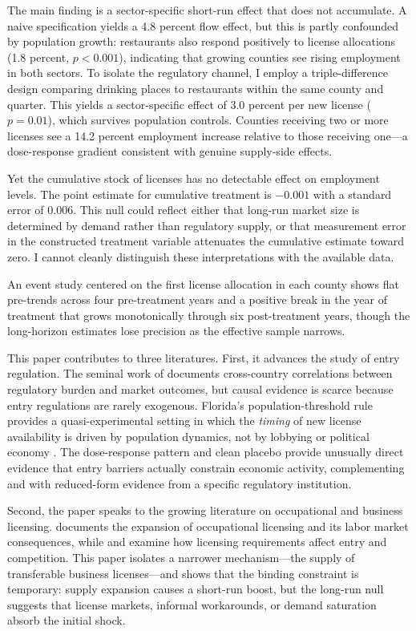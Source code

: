 \documentclass[12pt]{article}
\begin{document}
The main finding is a sector-specific short-run effect that does not accumulate. A naive specification yields a 4.8 percent flow effect, but this is partly confounded by population growth: restaurants also respond positively to license allocations (1.8 percent, $p < 0.001$), indicating that growing counties see rising employment in both sectors. To isolate the regulatory channel, I employ a triple-difference design comparing drinking places to restaurants within the same county and quarter. This yields a sector-specific effect of 3.0 percent per new license ($p = 0.01$), which survives population controls. Counties receiving two or more licenses see a 14.2 percent employment increase relative to those receiving one---a dose-response gradient consistent with genuine supply-side effects.

Yet the cumulative stock of licenses has no detectable effect on employment levels. The point estimate for cumulative treatment is $-0.001$ with a standard error of $0.006$. This null could reflect either that long-run market size is determined by demand rather than regulatory supply, or that measurement error in the constructed treatment variable attenuates the cumulative estimate toward zero. I cannot cleanly distinguish these interpretations with the available data.

An event study centered on the first license allocation in each county shows flat pre-trends across four pre-treatment years and a positive break in the year of treatment that grows monotonically through six post-treatment years, though the long-horizon estimates lose precision as the effective sample narrows.

This paper contributes to three literatures. First, it advances the study of entry regulation. The seminal work of \citet{djankov2002} documents cross-country correlations between regulatory burden and market outcomes, but causal evidence is scarce because entry regulations are rarely exogenous. Florida's population-threshold rule provides a quasi-experimental setting in which the \textit{timing} of new license availability is driven by population dynamics, not by lobbying or political economy \citep{stigler1971, peltzman1976}. The dose-response pattern and clean placebo provide unusually direct evidence that entry barriers actually constrain economic activity, complementing \citet{seim2006} and \citet{bresnahan1991} with reduced-form evidence from a specific regulatory institution.

Second, the paper speaks to the growing literature on occupational and business licensing. \citet{kleiner2000, kleiner2006} documents the expansion of occupational licensing and its labor market consequences, while \citet{carpenter2017} and \citet{timmons2018} examine how licensing requirements affect entry and competition. This paper isolates a narrower mechanism---the supply of transferable business licenses---and shows that the binding constraint is temporary: supply expansion causes a short-run boost, but the long-run null suggests that license markets, informal workarounds, or demand saturation absorb the initial shock.
\end{document}
